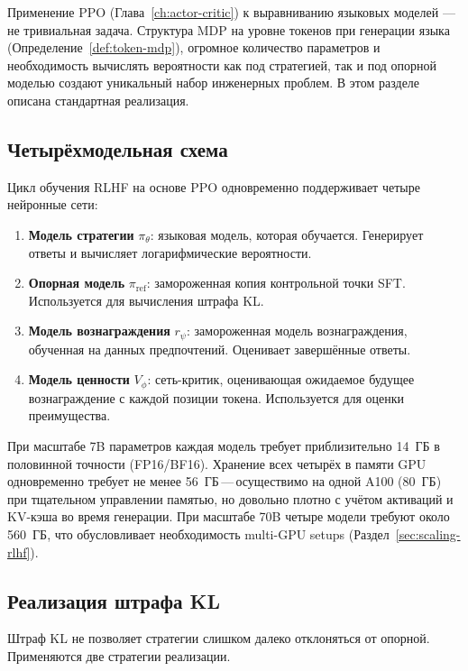 Применение PPO (Глава~\ref{ch:actor-critic}) к выравниванию языковых моделей --- не тривиальная задача. Структура MDP на уровне токенов при генерации языка (Определение~\ref{def:token-mdp}), огромное количество параметров и необходимость вычислять вероятности как под стратегией, так и под опорной моделью создают уникальный набор инженерных проблем. В этом разделе описана стандартная реализация.

\subsection{Четырёхмодельная схема}
\label{sec:four-models}

Цикл обучения RLHF на основе PPO одновременно поддерживает четыре нейронные сети:
\begin{enumerate}
  \item \textbf{Модель стратегии} $\pi_\theta$: языковая модель, которая обучается. Генерирует ответы и вычисляет логарифмические вероятности.
  \item \textbf{Опорная модель} $\pi_{\mathrm{ref}}$: замороженная копия контрольной точки SFT. Используется для вычисления штрафа KL.
  \item \textbf{Модель вознаграждения} $r_\psi$: замороженная модель вознаграждения, обученная на данных предпочтений. Оценивает завершённые ответы.
  \item \textbf{Модель ценности} $V_\phi$: сеть-критик, оценивающая ожидаемое будущее вознаграждение с каждой позиции токена. Используется для оценки преимущества.
\end{enumerate}

При масштабе 7B параметров каждая модель требует приблизительно 14~ГБ в половинной точности (FP16/BF16). Хранение всех четырёх в памяти GPU одновременно требует не менее 56~ГБ\,---\,осуществимо на одной A100 (80~ГБ) при тщательном управлении памятью, но довольно плотно с учётом активаций и KV-кэша во время генерации. При масштабе 70B четыре модели требуют около 560~ГБ, что обусловливает необходимость multi-GPU setups (Раздел~\ref{sec:scaling-rlhf}).

\subsection{Реализация штрафа KL}
\label{sec:kl-implementation}

Штраф KL не позволяет стратегии слишком далеко отклоняться от опорной. Применяются две стратегии реализации.

